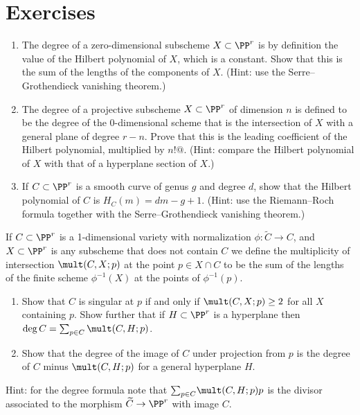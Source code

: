 \section{Exercises}


\begin{exercise}\label{characterization of degree}
%
%
\begin{enumerate}
\item The degree of a zero-dimensional subscheme $X\subset \PP^r$ is by definition the value of the Hilbert polynomial of $X$, which is a constant. Show that
this is the sum of the lengths of the components of $X$. (Hint: use the 
Serre--Grothendieck vanishing theorem.)
%
%

\item The degree of a projective subscheme $X\subset \PP^r$ of dimension $n$ is defined to be the degree of the $0$-dimensional scheme
%
%
that is the intersection of $X$ with a general plane of degree $r-n$. Prove that this is the leading coefficient of the Hilbert polynomial, multiplied
%
by $n!@$. (Hint: compare the Hilbert polynomial of $X$ with that of a hyperplane section of $X$.)

\item If $C\subset \PP^r$ is a smooth curve of genus $g$ and degree
  $d$, show that the 
 Hilbert polynomial of $C$ is $H_C(m) = dm-g+1$.
  (Hint: use the Riemann--Roch formula together with the
%
  Serre--Grothendieck vanishing theorem.)
\end{enumerate}
\end{exercise}

\begin{exercise}
If $C\subset \PP^r$ is a 1-dimensional variety with normalization $\phi: \widetilde C\to C$, and $X\subset \PP^r$ is any subscheme that does
not contain $C$
we define the 
%
multiplicity
 of intersection $\mult(C,X;p)$ at the point $p \in X \cap C$ to be the sum of the lengths of the finite scheme $\phi^{-1}(X)$ at the points of $\phi^{-1}(p)$.
\begin{enumerate}
\item Show that $C$ is singular at $p$ if and only if $\mult(C,X;p) \geq 2$ for all $X$ containing $p$. Show further that if $H\subset \PP^r$ 
is a hyperplane then
 $\deg C = \sum_{p\in C} \mult(C,H;p)$. 
 \item Show that the degree of the image of $C$ under projection from $p$
 is 
the degree of $C$ minus
$\mult(C,H;p)$ for a general hyperplane $H$.
\end{enumerate}
 
Hint: for 
the degree formula note that $\smash{\sum_{p\in C}}
\mult(C,H;p) p$ is the divisor associated to the morphism 
$\widetilde C \to \PP^r$ with image $C$.

\end{exercise}

